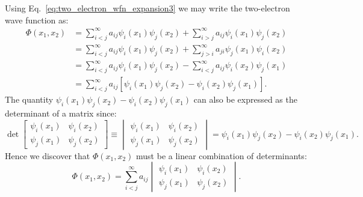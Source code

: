 \documentclass[../Main/chem532-notes.tex]{subfiles}
\begin{document}
\begin{example}
Using Eq.~\eqref{eq:two_electron_wfn_expansion3} we may write the two-electron wave function as:
\begin{equation}
\begin{split}
\Phi(x_1,x_2) &= \sum_{i<j}^{\infty} a_{ij} \psi_i(x_1) \psi_j(x_2) + \sum_{i>j}^{\infty} a_{ij} \psi_i(x_1) \psi_j(x_2) \\
&= \sum_{i<j}^{\infty} a_{ij} \psi_i(x_1) \psi_j(x_2) + \sum_{j>i}^{\infty} a_{ji} \psi_j(x_1) \psi_i(x_2) \\
&= \sum_{i<j}^{\infty} a_{ij} \psi_i(x_1) \psi_j(x_2) - \sum_{i<j}^{\infty} a_{ij} \psi_i(x_2) \psi_j(x_1) \\
&= \sum_{i<j}^{\infty} a_{ij} [ \psi_i(x_1) \psi_j(x_2) - \psi_i(x_2) \psi_j(x_1)].
\end{split}
\end{equation}
The quantity $\psi_i(x_1) \psi_j(x_2) - \psi_i(x_2) \psi_j(x_1)$ can also be expressed as the determinant of a matrix since:
\begin{equation}
\det
\begin{bmatrix}
\psi_i(x_1) & \psi_i(x_2) \\
\psi_j(x_1) & \psi_j(x_2) 
\end{bmatrix}
\equiv
\begin{vmatrix}
\psi_i(x_1) & \psi_i(x_2) \\
\psi_j(x_1) & \psi_j(x_2) 
\end{vmatrix}
=
\psi_i(x_1) \psi_j(x_2) - \psi_i(x_2) \psi_j(x_1).
\end{equation}
Hence we discover that $\Phi(x_1,x_2)$ must be a linear combination of determinants:
\begin{equation}
\Phi(x_1,x_2) = \sum_{i<j}^{\infty} a_{ij} 
\begin{vmatrix}
\psi_i(x_1) & \psi_i(x_2) \\
\psi_j(x_1) & \psi_j(x_2)
\end{vmatrix}.
\end{equation}
\end{example}
\end{document}
